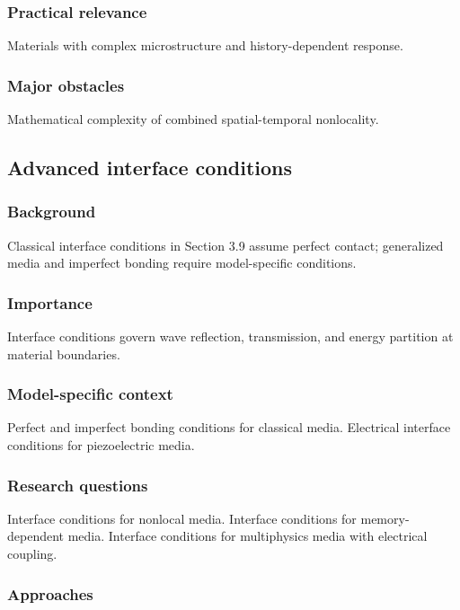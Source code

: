 \subsubsection{Practical relevance}

Materials with complex microstructure and history-dependent response.

\subsubsection{Major obstacles}

Mathematical complexity of combined spatial-temporal nonlocality.

\subsection{Advanced interface conditions}
\label{sec:advanced-interfaces}

\subsubsection{Background}

Classical interface conditions in Section 3.9 assume perfect contact; generalized media and imperfect bonding require model-specific conditions.

\subsubsection{Importance}

Interface conditions govern wave reflection, transmission, and energy partition at material boundaries.

\subsubsection{Model-specific context}

Perfect and imperfect bonding conditions for classical media. Electrical interface conditions for piezoelectric media.

\subsubsection{Research questions}

Interface conditions for nonlocal media. Interface conditions for memory-dependent media. Interface conditions for multiphysics media with electrical coupling.

\subsubsection{Approaches}

